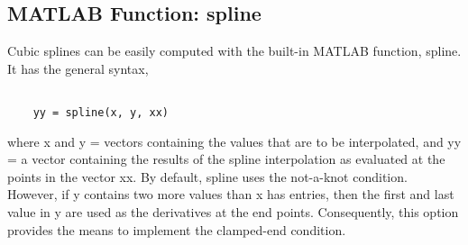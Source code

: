 \documentclass[../main.tex]{subfiles}
\begin{document}
\subsection{MATLAB Function: spline}
Cubic splines can be easily computed with the built-in MATLAB function, spline. It has
the general syntax,
\begin{lstlisting}[numbers=none]
    
    yy = spline(x, y, xx)
\end{lstlisting}

where x and y = vectors containing the values that are to be interpolated, and yy = a vector
containing the results of the spline interpolation as evaluated at the points in the vector xx.
By default, spline uses the not-a-knot condition. However, if y contains two more
values than x has entries, then the first and last value in y are used as the derivatives at the
end points. Consequently, this option provides the means to implement the clamped-end
condition.
\end{document}
